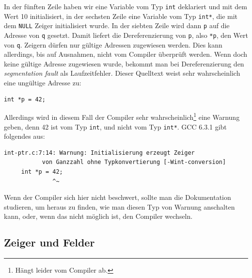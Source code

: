 In der fünften Zeile haben wir eine Variable vom Typ \verb|int| deklariert und mit dem Wert 10 initialisiert, in der sechsten Zeile eine Variable vom Typ \verb|int*|, die mit dem \verb|NULL| Zeiger initialisiert wurde.
In der siebten Zeile wird dann \verb|p| auf die Adresse von \verb|q| gesetzt.
Damit liefert die Dereferenzierung von \verb|p|, also \verb|*p|, den Wert von \verb|q|.
Zeigern dürfen nur gültige Adressen zugewiesen werden.
Dies kann allerdings, bis auf Ausnahmen, nicht vom Compiler überprüft werden.
Wenn doch keine gültige Adresse zugewiesen wurde, bekommt man bei Dereferenzierung den \emph{segmentation fault} als Laufzeitfehler.
Dieser Quelltext weist sehr wahrscheinlich eine ungültige Adresse zu:
\begin{lstlisting}
int *p = 42;
\end{lstlisting}
Allerdings wird in diesem Fall der Compiler sehr wahrscheinlich\footnote{Hängt leider vom Compiler ab.} eine Warnung geben, denn 42 ist vom Typ \verb|int|, und nicht vom Typ \verb|int*|.
GCC 6.3.1 gibt folgendes aus:
\begin{verbatim}
int-ptr.c:7:14: Warnung: Initialisierung erzeugt Zeiger 
           von Ganzzahl ohne Typkonvertierung [-Wint-conversion]
     int *p = 42;
              ^~
\end{verbatim}
Wenn der Compiler sich hier nicht beschwert, sollte man die Dokumentation studieren, um heraus zu finden, wie man diesen Typ von Warnung anschalten kann, oder, wenn das nicht möglich ist, den Compiler wechseln.

\subsection{Zeiger und Felder}

